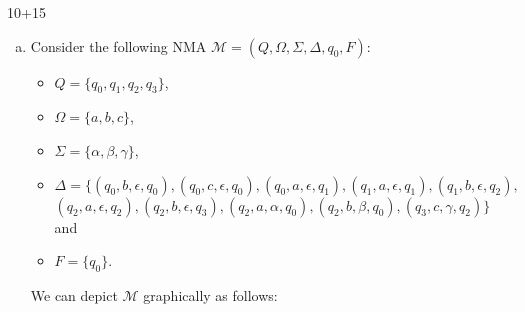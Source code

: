 \begin{exercise}{10+15}
\begin{enumerate}[a)]
\item Consider the following NMA $\mathcal{M}=(Q, \Omega, \Sigma, \Delta, q_0, F)$:
    \begin{itemize}
        \item $Q=\{q_0, q_1, q_2, q_3\}$,
        \item $\Omega=\{a,b,c\}$,
        \item $\Sigma=\{\alpha, \beta, \gamma\}$,
        \item $\Delta=\{(q_0,b,\epsilon,q_0), (q_0,c,\epsilon,q_0), (q_0,a,\epsilon,q_1), (q_1,a,\epsilon,q_1), (q_1,b,\epsilon,q_2),$\\
                       $(q_2,a,\epsilon,q_2), (q_2,b,\epsilon,q_3), (q_2,a,\alpha,q_0), (q_2,b,\beta,q_0), (q_3,c,\gamma,q_2)\}$ and
        \item $F=\{q_0\}$.
    \end{itemize}
    We can depict $\mathcal{M}$ graphically as follows:
    \begin{center}
\end{center}
\end{enumerate}
\end{exercise}
